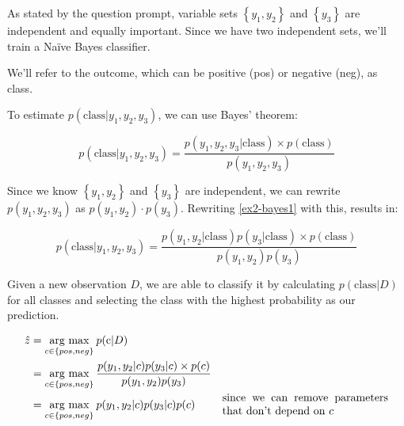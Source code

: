\documentclass[12pt]{article}
\begin{document}
\begin{enumerate}[leftmargin=\labelsep,resume]
          As stated by the question prompt, variable sets \(\left\{y_1, y_2\right\}\)
          and \(\left\{y_3\right\}\) are independent and equally important.
          Since we have two independent sets, we'll train a Naïve Bayes classifier.

          We'll refer to the outcome, which can be positive (pos) or
          negative (neg), as class.

          To estimate $p(\text{class} | y_1, y_2, y_3)$, we can use Bayes' theorem:

          \begin{equation}\label{ex2-bayes1}
              p(\text{class}| y_1, y_2, y_3) = \frac{p(y_1, y_2, y_3 | \text{class}) \times p(\text{class})}{p(y_1, y_2, y_3)}
          \end{equation}

          Since we know $\left\{y_1, y_2\right\}$ and $\left\{y_3\right\}$ are independent,
          we can rewrite $p(y_1, y_2, y_3)$ as $p(y_1, y_2) \cdot p(y_3)$.
          Rewriting \eqref{ex2-bayes1} with this, results in:

          \begin{equation}\label{ex2-bayes2}
              p(\text{class}| y_1, y_2, y_3) = \frac{p(y_1, y_2 | \text{class}) p(y_3 | \text{class}) \times p(\text{class})}{p(y_1, y_2)p(y_3)}
          \end{equation}

          Given a new observation $D$, we are able to classify it by calculating
          $p(\text{class}|D)$ for all classes and selecting the class with the
          highest probability as our prediction.

          $$
              \begin{aligned}
                  \hat{z} & = \underset{c \in \{pos, neg\}}{\text{arg max}} \medspace p(\text{c} | D)                                                                                                                           \\
                          & = \underset{c \in \{pos, neg\}}{\text{arg max}} \medspace \frac{p(y_1, y_2 | c) p(y_3 | c) \times p(c)}{p(y_1, y_2)p(y_3)}                                                                          \\
                          & = \underset{c \in \{pos, neg\}}{\text{arg max}} \medspace p(y_1, y_2 | c) p(y_3 | c) p(c)                                  & \parbox{15em}{since we can remove parameters that don't depend on $c$}
              \end{aligned}
          $$



\end{enumerate}
\end{document}
